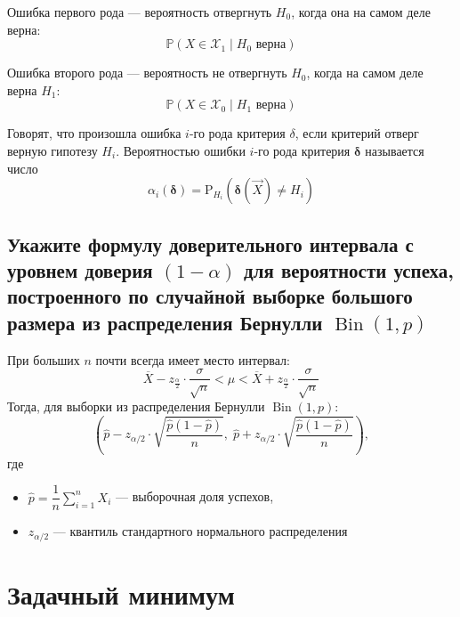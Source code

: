 \documentclass{article}
\begin{document}
 Ошибка первого рода — вероятность отвергнуть $H_0$, когда она на самом деле верна:
\begin{equation*}
    \mathbb{P}(X \in \mathcal{X}_1 \mid H_0 \text{ верна})
\end{equation*}

 Ошибка второго рода — вероятность не отвергнуть $H_0$, когда на самом деле верна $H_1$:
\begin{equation*}
    \mathbb{P}(X \in \mathcal{X}_0 \mid H_1 \text{ верна})
\end{equation*}

 Говорят, что произошла ошибка $i$-го рода критерия $\delta$, если критерий отверг верную гипотезу $H_i$. Вероятностью ошибки $i$-го рода критерия $\boldsymbol{\delta}$ называется число
\begin{equation*}
    \alpha_i(\boldsymbol{\delta})=\mathrm{P}_{H_i}\left(\boldsymbol{\delta}(\vec{X}) \neq H_i\right)
\end{equation*}
\subsection{Укажите формулу доверительного интервала с уровнем доверия $(1-\alpha)$ для вероятности успеха, построенного по случайной выборке большого размера из распределения Бернулли $\operatorname{Bin}(1, p)$}
При больших $n$ почти всегда имеет место интервал:
\begin{equation*}
    \overline{X}-z_{\frac{\alpha}{2}}\cdot\frac{\sigma}{\sqrt{n}}<\mu<\overline{X}+z_{\frac{\alpha}{2}}\cdot\frac{\sigma}{\sqrt{n}}
\end{equation*}
Тогда, для выборки из распределения Бернулли $\operatorname{Bin}(1, p)$:
\begin{equation*}
    \left( \hat{p} - z_{\alpha/2} \cdot \sqrt{\frac{\hat{p}(1 - \hat{p})}{n}},\; \hat{p} + z_{\alpha/2} \cdot \sqrt{\frac{\hat{p}(1 - \hat{p})}{n}} \right),
\end{equation*}
где
\begin{itemize}
    \item  $\hat{p} = \dfrac{1}{n} \sum_{i=1}^n X_i$ — выборочная доля успехов,
    \item $z_{\alpha/2}$ — квантиль стандартного нормального распределения
\end{itemize}

\newpage
\section{Задачный минимум}
\end{document}
